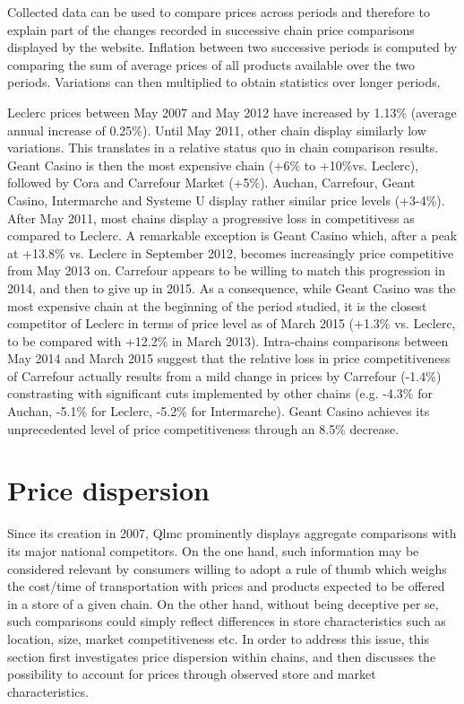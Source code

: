 \documentclass[english]{article}
\begin{document}
Collected data can be used to compare prices across periods and therefore to explain part of the changes recorded in successive chain price comparisons displayed by the website. Inflation between two successive periods is computed by comparing the sum of average prices of all products available over the two periods. Variations can then multiplied to obtain statistics over longer periods.

Leclerc prices between May 2007 and May 2012 have increased by 1.13\% (average annual increase of 0.25\%). Until May 2011, other chain display similarly low variations. This translates in a relative status quo in chain comparison results. Geant Casino is then the most expensive chain (+6\% to +10\%vs. Leclerc), followed by Cora and Carrefour Market (+5\%). Auchan, Carrefour, Geant Casino, Intermarche and Systeme U display rather similar price levels (+3-4\%).
After May 2011, most chains display a progressive loss in competitivess as compared to Leclerc. A remarkable exception is Geant Casino which, after a peak at +13.8\% vs. Leclerc in September 2012, becomes increasingly price competitive from May 2013 on. Carrefour appears to be willing to match this progression in 2014, and then to give up in 2015. As a consequence, while Geant Casino was the most expensive chain at the beginning of the period studied, it is the closest competitor of Leclerc in terms of price level as of March 2015 (+1.3\% vs. Leclerc, to be compared with +12.2\% in March 2013).
Intra-chains comparisons between May 2014 and March 2015 suggest that the relative loss in price competitiveness of Carrefour actually results from a mild change in prices by Carrefour (-1.4\%) constrasting with significant cuts implemented by other chains (e.g. -4.3\% for Auchan, -5.1\% for Leclerc, -5.2\% for Intermarche). Geant Casino achieves its unprecedented level of price competitiveness through an 8.5\% decrease.

\section{Price dispersion}

Since its creation in 2007, Qlmc prominently displays aggregate comparisons with its major national competitors. On the one hand, such information may be considered relevant by consumers willing to adopt a rule of thumb which weighs the cost/time of transportation with prices and products expected to be offered in a store of a given chain. On the other hand, without being deceptive per se, such comparisons could simply reflect differences in store characteristics such as location, size, market competitiveness etc. In order to address this issue, this section first investigates price dispersion within chains, and then discusses the possibility to account for prices through observed store and market characteristics.
\end{document}
